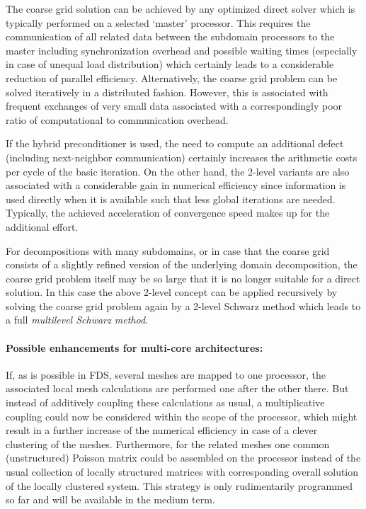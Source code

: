 The coarse grid solution can be achieved by any optimized direct solver which is typically performed on a selected `master' processor. This requires the communication of all related data between the subdomain processors to the master including synchronization overhead and possible waiting times (especially in case of unequal load distribution) which certainly leads to a considerable reduction of parallel efficiency.  
Alternatively, the coarse grid problem can be solved iteratively in a distributed fashion. However, this is associated with frequent exchanges of very small data associated with a correspondingly poor ratio of computational to communication overhead.

If the hybrid \tls{} preconditioner is used, the need to compute an additional defect (including next-neighbor communication) certainly increases the arithmetic costs per cycle of the \scarc{} basic iteration.
On the other hand, the 2-level variants are also associated with a considerable gain in numerical efficiency since information is used directly when it is available such that less global iterations are needed. Typically, the achieved acceleration of convergence speed makes up for the additional effort.

For decompositions with many subdomains, or in case that the coarse grid consists of a slightly refined version of the underlying domain decomposition, the coarse grid problem itself may be so large that it is no longer suitable for a direct solution. In this case the above 2-level concept can be applied recursively by solving the coarse grid problem again by a 2-level Schwarz method which leads to a full {\it multilevel Schwarz method}.

\paragraph{Possible enhancements for multi-core architectures:}
If, as is possible in FDS, several meshes are mapped to one processor, the associated local mesh calculations are performed one after the other there. But instead of additively coupling these calculations as usual, a multiplicative coupling could now be considered within the scope of the processor, which might result in a further increase of the numerical efficiency in case of a clever clustering of the meshes. Furthermore, for the related meshes one common (unstructured) Poisson matrix could be assembled on the processor instead of the usual collection of locally structured matrices with corresponding overall solution of the locally clustered system. This strategy is only rudimentarily programmed so far and will be available in the medium term.


